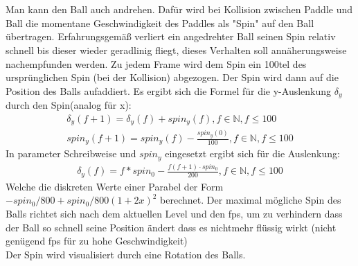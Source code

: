 \\\\
Man kann den Ball auch andrehen. Dafür wird bei Kollision zwischen Paddle und 
Ball die momentane Geschwindigkeit des Paddles als "Spin" auf den Ball 
übertragen. Erfahrungsgemäß verliert ein angedrehter Ball seinen Spin relativ 
schnell bis dieser wieder geradlinig fliegt, dieses Verhalten soll 
annäherungsweise nachempfunden werden.
Zu jedem Frame wird dem Spin ein 100tel des ursprünglichen Spin (bei der Kollision)
abgezogen. Der Spin wird dann auf die Position des Balls aufaddiert.
Es ergibt sich die Formel für die y-Auslenkung $\delta_y$ durch den Spin(analog für x):
\begin{align}
	\delta_y(f+1) = \delta_y(f) + spin_y(f), f \in \mathbb{N}, f \leq 100\\
	spin_y(f+1) = spin_y(f) - \frac{spin_y(0)}{100}, f \in \mathbb{N}, f \leq 100
\end{align}
In parameter Schreibweise und $spin_y$ eingesetzt ergibt sich für die Auslenkung:
\begin{align}
	\delta_y(f) = f*spin_0-\frac{f(f+1)\cdot spin_0}{200}, f \in \mathbb{N}, f \leq 100
\end{align}
Welche die diskreten Werte einer Parabel der Form $-spin_0/800+spin_0/800 (1+2 x)^2$ berechnet.
Der maximal mögliche Spin des Balls richtet sich nach dem aktuellen Level und den fps, 
um zu verhindern dass der Ball so schnell seine Position ändert dass es nichtmehr flüssig wirkt (nicht genügend fps für zu hohe Geschwindigkeit)
\\
Der Spin wird visualisiert durch eine Rotation des Balls.
\\\\

